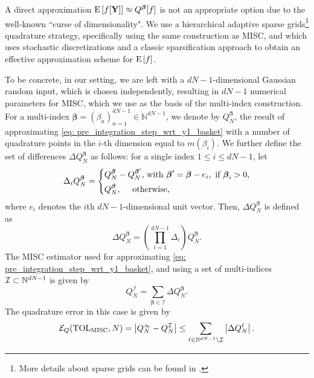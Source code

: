 A direct approximation $\mathrm{E}\left[f[\mathbf{Y}]\right] \approx Q^{\boldsymbol{\beta}}[f]$ is not an appropriate option  due to the well-known ``curse of dimensionality". We use  a hierarchical adaptive sparse grids\footnote{More details about sparse grids can be found in \cite{bungartz2004sparse}.} quadrature strategy, specifically using the same
construction as MISC, and which uses  stochastic discretizations  and a classic sparsification approach to obtain an effective approximation scheme for $\mathrm{E}\left[f\right]$. 

To be concrete, in our setting, we are left with a $dN-1$-dimensional Gaussian random input, which is chosen independently, resulting in  $dN-1$ numerical parameters for MISC, which we use as the basis of the multi-index construction. For a multi-index $\boldsymbol{\beta} = (\beta_n)_{n=1}^{dN-1} \in \mathbb{N}^{dN-1}$, we denote  by
$Q_N^{\boldsymbol{\beta}}$,   the result of approximating \eqref{eq: pre_integration_step_wrt_y1_basket} with a number of quadrature points  in the $i$-th dimension equal to  $m(\beta_i)$. We further define the set of
differences $\Delta Q_N^{\boldsymbol{\beta}}$ as follows: for a single index $1 \le i \le dN-1$,
let
\begin{equation*}
\Delta_i Q_N^{\boldsymbol{\beta}} = \left\{ 
\aligned 
 Q_N^{\boldsymbol{\beta}} &- Q_N^{\boldsymbol{\beta}'}  \text{, with } \boldsymbol{\beta}' =\boldsymbol{\beta} - e_i, \text{ if } \boldsymbol{\beta}_i>0 \COMMA \\
 Q_N^{\boldsymbol{\beta}} &, \quad  \text{ otherwise,}
\endaligned
\right.
\end{equation*}
where $e_i$ denotes the $i$th $dN-1$-dimensional unit vector. Then, $\Delta
Q_N^{\boldsymbol{\beta}}$ is defined as
\begin{equation*}
\Delta Q_N^{\boldsymbol{\beta}} = \left( \prod_{i=1}^{dN-1} \Delta_i \right) Q_N^{\boldsymbol{\beta}}.
\end{equation*}
The MISC estimator used for approximating \eqref{eq: pre_integration_step_wrt_y1_basket}, and using a set of multi-indices $\mathcal{I}\subset \mathbb{N}^{dN-1}$ is given by
\begin{equation}\label{eq:MISC_quad_estimator}
	Q_N^{\mathcal{I}} = \sum_{\boldsymbol{\beta} \in \mathcal{I}} \Delta Q_N^{\boldsymbol{\beta}}.
\end{equation}
The quadrature error in this  case  is given by
\begin{equation}\label{eq:quadrature error}
\mathcal{E}_Q(\text{TOL}_{\text{MISC}},N) =\left\lvert Q_N^\infty - Q_N^\mathcal{I}\right\rvert \le \sum_{\ell \in \mathbb{N}^{dN-1} \setminus
	\mathcal{I}} \left\lvert\Delta Q_N^\ell\right\rvert.
\end{equation}
